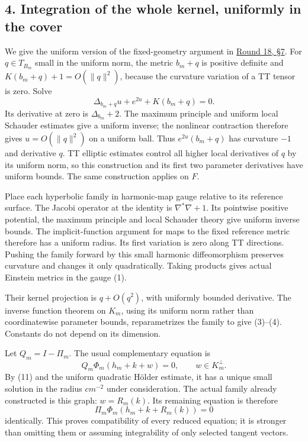 \documentclass[
  11pt,
]{article}
\begin{document}
\hypertarget{integration-of-the-whole-kernel-uniformly-in-the-cover}{%
\subsection{4. Integration of the whole kernel, uniformly in the
cover}\label{integration-of-the-whole-kernel-uniformly-in-the-cover}}

We give the uniform version of the fixed-geometry argument in
\href{../mathematics/current/round18_twisted_operator.md}{Round 18, §7}.
For \(q\in T_{B_m}\) small in the uniform norm, the metric \(b_m+q\) is
positive definite and \(K(b_m+q)+1=O(\|q\|^2)\), because the curvature
variation of a TT tensor is zero. Solve \[
 \Delta_{b_m+q}u+e^{2u}+K(b_m+q)=0.                         \tag{12}
\] Its derivative at zero is \(\Delta_{b_m}+2\). The maximum principle
and uniform local Schauder estimates give a uniform inverse; the
nonlinear contraction therefore gives \(u=O(\|q\|^2)\) on a uniform
ball. Thus \(e^{2u}(b_m+q)\) has curvature \(-1\) and derivative \(q\).
TT elliptic estimates control all higher local derivatives of \(q\) by
its uniform norm, so this construction and its first two parameter
derivatives have uniform bounds. The same construction applies on \(F\).

Place each hyperbolic family in harmonic-map gauge relative to its
reference surface. The Jacobi operator at the identity is
\(\nabla^*\nabla+1\). Its pointwise positive potential, the maximum
principle and local Schauder theory give uniform inverse bounds. The
implicit-function argument for maps to the fixed reference metric
therefore has a uniform radius. Its first variation is zero along TT
directions. Pushing the family forward by this small harmonic
diffeomorphism preserves curvature and changes it only quadratically.
Taking products gives actual Einstein metrics in the gauge (1).

Their kernel projection is \(q+O(q^2)\), with uniformly bounded
derivative. The inverse function theorem on \(K_m\), using its uniform
norm rather than coordinatewise parameter bounds, reparametrizes the
family to give (3)--(4). Constants do not depend on its dimension.

Let \(Q_m=I-\Pi_m\). The usual complementary equation is \[
 Q_m\Phi_m(h_m+k+w)=0,\qquad w\in K_m^\perp.
\] By (11) and the uniform quadratic Hölder estimate, it has a unique
small solution in the radius \(c m^{-2}\) under consideration. The
actual family already constructed is this graph: \(w=R_m(k)\). Its
remaining equation is therefore \[
 \boxed{\ \Pi_m\Phi_m(h_m+k+R_m(k))=0\ }
\] identically. This proves compatibility of every reduced equation; it
is stronger than omitting them or assuming integrability of only
selected tangent vectors.
\end{document}
